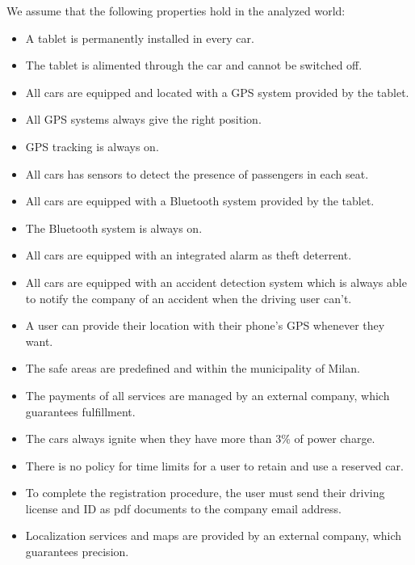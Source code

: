 We assume that the following properties hold in the analyzed world:			
			
			\begin{itemize}
				\item A tablet is permanently installed in every car. %
				\item The tablet is alimented through the car and cannot be switched off.
				\item All cars are equipped and located with a GPS system provided by the tablet.
				\item All GPS systems always give the right position.
				\item GPS tracking is always on.
				\item All cars has sensors to detect the presence of passengers in each seat.
				\item All cars are equipped with a Bluetooth system provided by the tablet.
				\item The Bluetooth system is always on.
				\item All cars are equipped with an integrated alarm as theft deterrent. %
				\item All cars are equipped with an accident detection system which is always able to notify the company of an accident when the driving user can't. 
				\item A user can provide their location with their phone's GPS whenever they want. 
				\item The safe areas are predefined and within the municipality of Milan.
				\item The payments of all services are managed by an external company, which guarantees fulfillment.
				\item The cars always ignite when they have more than 3\% of power charge.
				\item There is no policy for time limits for a user to retain and use a reserved car. %
				\item To complete the registration procedure, the user must send their driving license and ID as pdf documents to the company email address.
				\item Localization services and maps are provided by an external company, which guarantees precision. 
				
			\end{itemize}